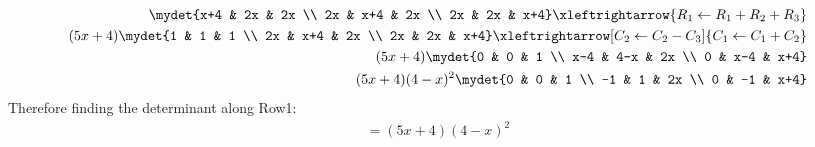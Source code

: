 \begin{align}
    \mydet{x+4 & 2x & 2x \\ 2x & x+4 & 2x \\ 2x & 2x & x+4}
    \xleftrightarrow{R_1 \leftarrow R_1+R_2+R_3}\\
    (5x+4)\mydet{1 & 1 & 1 \\ 2x & x+4 & 2x \\ 2x & 2x & x+4}
    \xleftrightarrow[C_2 \leftarrow C_2-C_3]{C_1 \leftarrow C_1+C_2}\\
    (5x+4)\mydet{0 & 0 & 1 \\ x-4 & 4-x & 2x \\ 0 & x-4 & x+4}\\
    (5x+4)(4-x)^2\mydet{0 & 0 & 1 \\ -1 & 1 & 2x \\ 0 & -1 & x+4}
\end{align}
Therefore finding the determinant along Row1:
\begin{align}
    =(5x+4)(4-x)^2
\end{align}

